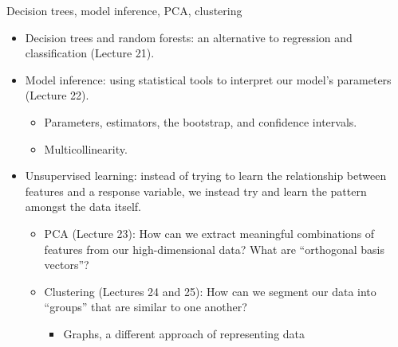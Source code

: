 \documentclass[aspectratio=169]{../latex_main/tntbeamer}  %
\begin{document}
	\begin{frame}{Decision trees, model inference, PCA, clustering}
	    \begin{itemize}
	        \item Decision trees and random forests: an alternative to regression and classification (Lecture 21).
	        \item Model inference: using statistical tools to interpret our model’s parameters (Lecture 22).
	        \begin{itemize}
	            \item Parameters, estimators, the bootstrap, and confidence intervals.
	            \item Multicollinearity.
	        \end{itemize}
	        \item Unsupervised learning: instead of trying to learn the relationship between features and a response variable, we instead try and learn the pattern amongst the data itself.
	        \begin{itemize}
	            \item PCA (Lecture 23): How can we extract meaningful combinations of features from our high-dimensional data? What are “orthogonal basis vectors”?
	            \item Clustering (Lectures 24 and 25): How can we segment our data into “groups” that are similar to one another?
	            \begin{itemize}
	                \item  Graphs, a different approach of representing data
	            \end{itemize}
	        \end{itemize}
	    \end{itemize}
	\end{frame}
	
\end{document}
